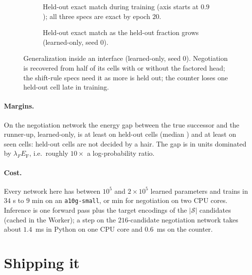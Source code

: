 \documentclass{article}
\theoremstyle{plain}
\theoremstyle{definition}
\theoremstyle{remark}
\newcommand{\Sset}{\mathcal{S}}
\newcommand{\Ef}{E_{\mathrm{F}}}
\begin{document}
\begin{figure}[t]
\centering
\begin{subfigure}[t]{0.48\textwidth}
\centering

\caption{Held-out exact match during training (axis starts at $0.9$); all three specs are exact by epoch $20$.}
\label{fig:curves}
\end{subfigure}\hfill
\begin{subfigure}[t]{0.48\textwidth}
\centering

\caption{Held-out exact match as the held-out fraction grows (learned-only, seed 0).}
\label{fig:holdout}
\end{subfigure}
\caption{Generalization inside an interface (learned-only, seed 0). Negotiation is recovered from half of its cells with or without the factored head; the shift-rule specs need it as more is held out; the counter loses one held-out cell late in training.}
\label{fig:gen}
\end{figure}

\paragraph{Margins.} On the negotiation network the energy gap between the true successor and the runner-up, learned-only, is at least \negmarginmin{} on held-out cells (median \negmarginmed{}) and at least \negmarginminseen{} on seen cells: held-out cells are not decided by a hair. The gap is in units dominated by $\lambda_F\Ef$, i.e.\ roughly $10\times$ a log-probability ratio.

\paragraph{Cost.} Every network here has between $10^5$ and $2\times10^5$ learned parameters and trains in $34$ s to $9$ min on an \texttt{a10g-small}, or \negcpu{} min for negotiation on two CPU cores. Inference is one forward pass plus the target encodings of the $|\Sset|$ candidates (cached in the Worker); a step on the $216$-candidate negotiation network takes about $1.4$~ms in Python on one CPU core and $0.6$~ms on the counter.

\section{Shipping it}
\label{sec:ship}
\end{document}
